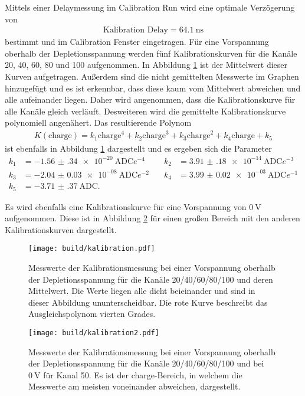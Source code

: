 Mittels einer Delaymessung im Calibration Run wird eine optimale Verzögerung von
\begin{align}
  \text{Kalibration Delay} = \SI{64.1}{\nano\second}
\end{align}
bestimmt und im Calibration Fenster eingetragen. Für eine Vorspannung oberhalb der
Depletionsspannung werden fünf Kalibrationskurven für die Kanäle 20, 40, 60, 80 und 100 aufgenommen. In Abbildung \ref{fig:kalibration}
ist der Mittelwert dieser Kurven aufgetragen. Außerdem sind die nicht gemittelten
Messwerte im Graphen hinzugefügt und es ist erkennbar, dass diese kaum vom Mittelwert abweichen und
alle aufeinander liegen. Daher wird angenommen, dass die Kalibrationskurve für alle Kanäle gleich verläuft. Desweiteren wird die gemittelte Kalibrationskurve polynomiell angenähert.
Das resultierende Polynom
\begin{align}
  K(\text{charge}) = k_1 \text{charge}^4 + k_2 \text{charge}^3 + k_3 \text{charge}^2 + k_4 \text{charge} + k_5
  \label{eqn:kalibrationspolynom}
\end{align}
ist ebenfalls in Abbildung \ref{fig:kalibration} dargestellt und es ergeben sich die Parameter
\begin{align*}
  k_1 &= \SI{-1.56(34)e-20}{\text{ADC}e^{-4}} &\quad k_2 &= \SI{3.91(18)e-14}{\text{ADC}e^{-3}} \\
  k_3 &= \SI{-2.04(3)e-08}{\text{ADC}e^{-2}} &\quad k_4 &= \SI{3.99(2)e-03}{\text{ADC}e^{-1}} \\
  k_5 &= \SI{-3.71(37)}{\text{ADC}}. &\quad \phantom{f}&\phantom{=10}
\end{align*}

Es wird ebenfalls eine Kalibrationskurve für eine Vorspannung von $\SI{0}{\volt}$ aufgenommen. Diese ist in Abbildung
\ref{fig:kalibration2} für einen großen Bereich mit den anderen Kalibrationskurven dargestellt.

\begin{figure}
  \centering
  \texttt{[image: build/kalibration.pdf]}
  \caption{Messwerte der Kalibrationsmessung bei einer Vorspannung oberhalb der Depletionsspannung für die Kanäle 20/40/60/80/100 und deren Mittelwert.
  Die Werte liegen alle dicht beieinander und sind in dieser Abbildung ununterscheidbar. Die rote Kurve beschreibt das Ausgleichspolynom vierten Grades.}
  \label{fig:kalibration}
\end{figure}

\begin{figure}
  \centering
  \texttt{[image: build/kalibration2.pdf]}
  \caption{Messwerte der Kalibrationsmessung bei einer Vorspannung oberhalb der Depletionsspannung für die Kanäle 20/40/60/80/100 und bei $\SI{0}{\volt}$ für Kanal 50.
  Es ist der charge-Bereich, in welchem die Messwerte am meisten voneinander abweichen, dargestellt.}
  \label{fig:kalibration2}
\end{figure}

